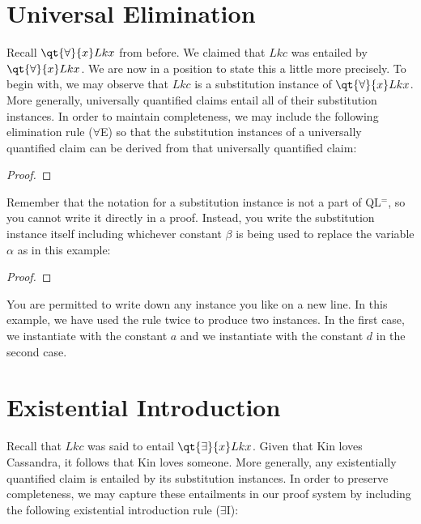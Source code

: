 \section{Universal Elimination}
  \label{sec:UniElim}

Recall $\qt{\forall}{x} Lkx$ from before.
We claimed that $Lkc$ was entailed by $\qt{\forall}{x} Lkx$.
We are now in a position to state this a little more precisely.
To begin with, we may observe that $Lkc$ is a substitution instance of $\qt{\forall}{x} Lkx$.
More generally, universally quantified claims entail all of their substitution instances.
In order to maintain completeness, we may include the following elimination rule ($\forall$E) so that the substitution instances of a universally quantified claim can be derived from that universally quantified claim:

\begin{proof}
	  
\end{proof}

Remember that the notation for a substitution instance is not a part of QL$^=$, so you cannot write it directly in a proof.
Instead, you write the substitution instance itself including whichever constant $\beta$ is being used to replace the variable $\alpha$ as in this example:

\begin{proof}
	 \pr{}
	 
	 
\end{proof}

You are permitted to write down any instance you like on a new line. In this example, we have used the rule twice to produce two instances. In the first case, we instantiate with the constant $a$ and we instantiate with the constant $d$ in the second case. 






\section{Existential Introduction}
  \label{sec:ExistIntro}

Recall that $Lkc$ was said to entail $\qt{\exists}{x} Lkx$.
Given that Kin loves Cassandra, it follows that Kin loves someone.
More generally, any existentially quantified claim is entailed by its substitution instances.
In order to preserve completeness, we may capture these entailments in our proof system by including the following existential introduction rule ($\exists$I):

